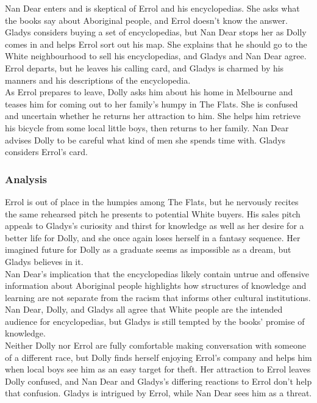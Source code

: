 \documentclass[a4paper]{article}
\begin{document}
Nan Dear enters and is skeptical of Errol and his encyclopedias.
She asks what the books say about Aboriginal people, and Errol
doesn’t know the answer. Gladys considers buying a set of
encyclopedias, but Nan Dear stops her as Dolly comes in and
helps Errol sort out his map. She explains that he should go to
the White neighbourhood to sell his encyclopedias, and Gladys
and Nan Dear agree. Errol departs, but he leaves his calling
card, and Gladys is charmed by his manners and his
descriptions of the encyclopedia.\\

As Errol prepares to leave, Dolly asks him about his home in
Melbourne and teases him for coming out to her family’s
humpy in The Flats. She is confused and uncertain whether he
returns her attraction to him. She helps him retrieve his bicycle
from some local little boys, then returns to her family. Nan
Dear advises Dolly to be careful what kind of men she spends
time with. Gladys considers Errol’s card.\\

\subsubsection{Analysis}
Errol is out of place in the humpies among The Flats, but he
nervously recites the same rehearsed pitch he presents to potential
White buyers. His sales pitch appeals to Gladys’s curiosity and
thirst for knowledge as well as her desire for a better life for Dolly,
and she once again loses herself in a fantasy sequence. Her
imagined future for Dolly as a graduate seems as impossible as a
dream, but Gladys believes in it.\\

Nan Dear’s implication that the encyclopedias likely contain untrue
and offensive information about Aboriginal people highlights how
structures of knowledge and learning are not separate from the
racism that informs other cultural institutions. Nan Dear, Dolly, and
Gladys all agree that White people are the intended audience for
encyclopedias, but Gladys is still tempted by the books’ promise of
knowledge.\\

Neither Dolly nor Errol are fully comfortable making conversation
with someone of a different race, but Dolly finds herself enjoying
Errol’s company and helps him when local boys see him as an easy
target for theft. Her attraction to Errol leaves Dolly confused, and
Nan Dear and Gladys’s differing reactions to Errol don’t help that
confusion. Gladys is intrigued by Errol, while Nan Dear sees him as
a threat.\\
\end{document}

